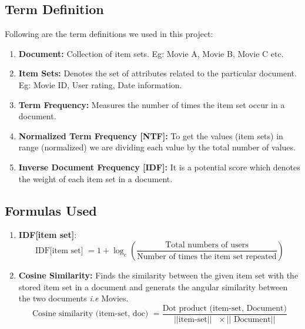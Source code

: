 \documentclass[12pt, titlepage, onecolumn]{article}
\begin{document}
{\subsection{Term Definition}
Following are the term definitions we used in this project:
\begin{enumerate}
	\item{\bf Document: }Collection of item sets. Eg: Movie A, Movie B, Movie C etc.
	
	\item {\bf Item Sets: } Denotes the set of attributes related to the particular document. Eg: Movie ID, User rating, Date information.
	
	\item{\bf Term Frequency: } Measures the number of times the item set occur in a document.
	
	\item{\bf Normalized Term Frequency [NTF]: }To get the values (item sets) in range (normalized) we are dividing each value by the total number of values.
	
	\item {\bf Inverse Document Frequency [IDF]: }It is a potential score which denotes the weight of each item set in a document.
\end{enumerate}

\subsection{Formulas Used}
\label{sec: formulas}
\begin{enumerate}
	\item{\bf IDF[item set]}:
	\label{itm: idf_item}
		\begin{equation}
			\text{IDF[item set] }= 1 + \log_{e} ( \frac{\text{Total numbers of users}}{\text{Number of times the item set repeated}})
		\end{equation}
	
	\item{\bf Cosine Similarity: } Finds the similarity between the given item set with the stored item set in a document and generats the angular similarity between the two documents \emph{i.e} Movies.
	\label{itm: cosineFormula}
		\begin{equation}
		\label{eq: idf}
			\text{Cosine similarity (item-set, doc) } = \frac{\text{Dot product (item-set, Document)}}{||\text{item-set}||\text{ }\times ||\text{ Document}||}
		\end{equation}
\end{enumerate}

}
\end{document}
